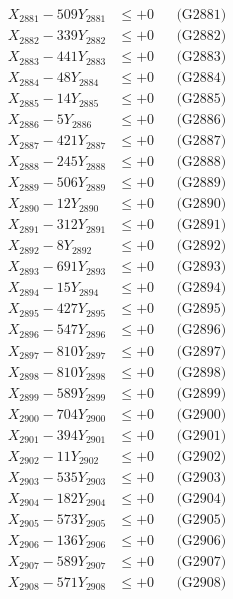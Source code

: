\documentclass[a4paper,10pt]{article}
\begin{document}
{\begin{align}
\allowbreak
X_{2881} - 509Y_{2881} &\leq +0 && \text{(G2881)} \\
X_{2882} - 339Y_{2882} &\leq +0 && \text{(G2882)} \\
X_{2883} - 441Y_{2883} &\leq +0 && \text{(G2883)} \\
X_{2884} - 48Y_{2884} &\leq +0 && \text{(G2884)} \\
X_{2885} - 14Y_{2885} &\leq +0 && \text{(G2885)} \\
X_{2886} - 5Y_{2886} &\leq +0 && \text{(G2886)} \\
X_{2887} - 421Y_{2887} &\leq +0 && \text{(G2887)} \\
X_{2888} - 245Y_{2888} &\leq +0 && \text{(G2888)} \\
X_{2889} - 506Y_{2889} &\leq +0 && \text{(G2889)} \\
X_{2890} - 12Y_{2890} &\leq +0 && \text{(G2890)} \\
\allowbreak
X_{2891} - 312Y_{2891} &\leq +0 && \text{(G2891)} \\
X_{2892} - 8Y_{2892} &\leq +0 && \text{(G2892)} \\
X_{2893} - 691Y_{2893} &\leq +0 && \text{(G2893)} \\
X_{2894} - 15Y_{2894} &\leq +0 && \text{(G2894)} \\
X_{2895} - 427Y_{2895} &\leq +0 && \text{(G2895)} \\
X_{2896} - 547Y_{2896} &\leq +0 && \text{(G2896)} \\
X_{2897} - 810Y_{2897} &\leq +0 && \text{(G2897)} \\
X_{2898} - 810Y_{2898} &\leq +0 && \text{(G2898)} \\
X_{2899} - 589Y_{2899} &\leq +0 && \text{(G2899)} \\
X_{2900} - 704Y_{2900} &\leq +0 && \text{(G2900)} \\
\allowbreak
X_{2901} - 394Y_{2901} &\leq +0 && \text{(G2901)} \\
X_{2902} - 11Y_{2902} &\leq +0 && \text{(G2902)} \\
X_{2903} - 535Y_{2903} &\leq +0 && \text{(G2903)} \\
X_{2904} - 182Y_{2904} &\leq +0 && \text{(G2904)} \\
X_{2905} - 573Y_{2905} &\leq +0 && \text{(G2905)} \\
X_{2906} - 136Y_{2906} &\leq +0 && \text{(G2906)} \\
X_{2907} - 589Y_{2907} &\leq +0 && \text{(G2907)} \\
X_{2908} - 571Y_{2908} &\leq +0 && \text{(G2908)} \\

\end{align}}
\end{document}
